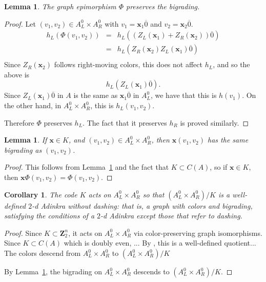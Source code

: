 \documentclass[12pt,twoside,singlespace]{article}
\numberwithin{equation}{section}
\newtheorem{lem}[equation]{Lemma}
\newtheorem{cor}[equation]{Corollary}
\theoremstyle{definition}
\newcommand{\ZZ}{\mathbf{Z}}
\renewcommand{\vec}[1]{\mathbf{#1}}
\begin{document}
\begin{lem}
\label{lem:mainepibigrading}
The graph epimorphism $\Phi$ preserves the bigrading.
\end{lem}
\begin{proof}
Let $(v_1,v_2)\in A_L^0\times A_R^0$ with $v_1=\vec{x}_1\overline{0}$ and $v_2=\vec{x}_2\overline{0}$. 
\begin{eqnarray*}
h_L(\Phi(v_1,v_2)) &=& h_L((Z_L(\vec{x}_1)+Z_R(\vec{x}_2))\overline{0})\\
 &=& h_L(Z_R(\vec{x}_2)Z_L(\vec{x}_1)\overline{0})\\
\end{eqnarray*}
Since $Z_R(\vec{x}_2)$ follows right-moving colors, this does not affect $h_L$, and so the above is
\[h_L(Z_L(\vec{x}_1)\overline{0}).\]
Since $Z_L(\vec{x}_1)\overline{0}$ in $A$ is the same as $\vec{x}_1\overline{0}$ in $A_L^0$, we have that this is $h(v_1)$.  On the other hand, in $A_L^0\times A_R^0$, this is $h_L(v_1,v_2)$.

Therefore $\Phi$ preserves $h_L$.  The fact that it preserves $h_R$ is proved similarly.
\end{proof}

\begin{lem}
\label{lem:kgrading}
If $\vec{x}\in K$, and $(v_1,v_2)\in A_L^0\times A_R^0$, then $\vec{x}(v_1,v_2)$ has the same bigrading as $(v_1,v_2)$.
\end{lem}
\begin{proof}
This follows from Lemma~\ref{lem:mainepibigrading} and the fact that $K\subset C(A)$, so if $\vec{x}\in K$, then $\vec{x}\Phi(v_1,v_2)=\Phi(v_1,v_2)$.
\end{proof}

\begin{cor}
\label{cor:kquotient}
The code $K$ acts on $A_L^0\times A_R^0$ so that $(A_L^0\times A_R^0)/K$ is a well-defined $2$-d Adinkra without dashing: that is, a graph with colors and bigrading, satisfying the conditions of a $2$-d Adinkra except those that refer to dashing.
\end{cor}
\begin{proof}
Since $K\subset \ZZ_2^n$, it acts on $A_L^0\times A_R^0$ via color-preserving graph isomorphisms.  Since $K\subset C(A)$ which is doubly even, ...
By \cite{zhang:adinkras}, this is a well-defined quotient...
The colors descend from $A_L^0\times A_R^0$ to $(A_L^0\times A_R^0)/K$

By Lemma~\ref{lem:kgrading}, the bigrading on $A_L^0\times A_R^0$ descends to $(A_L^0\times A_R^0)/K$.
\end{proof}
\end{document}
